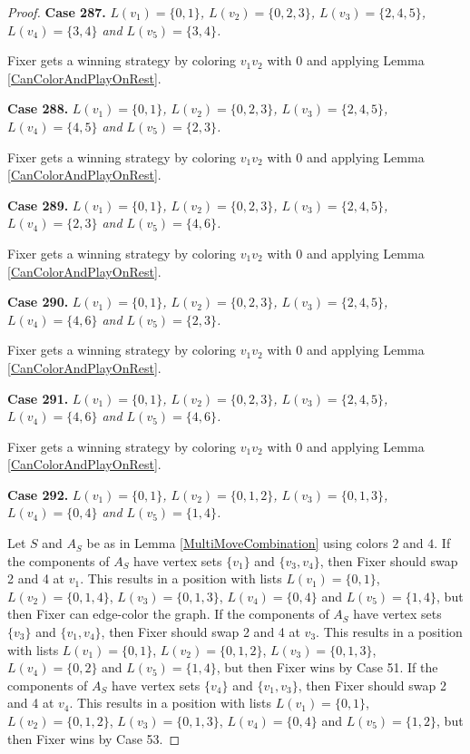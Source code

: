 \documentclass[12pt]{amsart}
\theoremstyle{plain}
\theoremstyle{definition}
\theoremstyle{remark}
\begin{document}
\begin{proof}
\noindent\textbf{Case 287.  }\textit{$L(v_1) = \{0, 1\}$, $L(v_2) = \{0, 2, 3\}$, $L(v_3) = \{2, 4, 5\}$, $L(v_4) = \{3, 4\}$ and $L(v_5) = \{3, 4\}$.}

Fixer gets a winning strategy by coloring $v_1v_2$ with $0$ and applying Lemma \ref{CanColorAndPlayOnRest}.

\noindent\textbf{Case 288.  }\textit{$L(v_1) = \{0, 1\}$, $L(v_2) = \{0, 2, 3\}$, $L(v_3) = \{2, 4, 5\}$, $L(v_4) = \{4, 5\}$ and $L(v_5) = \{2, 3\}$.}

Fixer gets a winning strategy by coloring $v_1v_2$ with $0$ and applying Lemma \ref{CanColorAndPlayOnRest}.

\noindent\textbf{Case 289.  }\textit{$L(v_1) = \{0, 1\}$, $L(v_2) = \{0, 2, 3\}$, $L(v_3) = \{2, 4, 5\}$, $L(v_4) = \{2, 3\}$ and $L(v_5) = \{4, 6\}$.}

Fixer gets a winning strategy by coloring $v_1v_2$ with $0$ and applying Lemma \ref{CanColorAndPlayOnRest}.

\noindent\textbf{Case 290.  }\textit{$L(v_1) = \{0, 1\}$, $L(v_2) = \{0, 2, 3\}$, $L(v_3) = \{2, 4, 5\}$, $L(v_4) = \{4, 6\}$ and $L(v_5) = \{2, 3\}$.}

Fixer gets a winning strategy by coloring $v_1v_2$ with $0$ and applying Lemma \ref{CanColorAndPlayOnRest}.

\noindent\textbf{Case 291.  }\textit{$L(v_1) = \{0, 1\}$, $L(v_2) = \{0, 2, 3\}$, $L(v_3) = \{2, 4, 5\}$, $L(v_4) = \{4, 6\}$ and $L(v_5) = \{4, 6\}$.}

Fixer gets a winning strategy by coloring $v_1v_2$ with $0$ and applying Lemma \ref{CanColorAndPlayOnRest}.

\noindent\textbf{Case 292.  }\textit{$L(v_1) = \{0, 1\}$, $L(v_2) = \{0, 1, 2\}$, $L(v_3) = \{0, 1, 3\}$, $L(v_4) = \{0, 4\}$ and $L(v_5) = \{1, 4\}$.}

Let $S$ and $A_S$ be as in Lemma \ref{MultiMoveCombination} using colors $2$ and $4$. If the components of $A_S$ have vertex sets $\{v_1\}$ and $\{v_3, v_4\}$, then Fixer should swap 2 and 4 at $v_1$. This results in a position with lists $L(v_1) = \{0, 1\}$, $L(v_2) = \{0, 1, 4\}$, $L(v_3) = \{0, 1, 3\}$, $L(v_4) = \{0, 4\}$ and $L(v_5) = \{1, 4\}$, but then Fixer can edge-color the graph. If the components of $A_S$ have vertex sets $\{v_3\}$ and $\{v_1, v_4\}$, then Fixer should swap 2 and 4 at $v_3$. This results in a position with lists $L(v_1) = \{0, 1\}$, $L(v_2) = \{0, 1, 2\}$, $L(v_3) = \{0, 1, 3\}$, $L(v_4) = \{0, 2\}$ and $L(v_5) = \{1, 4\}$, but then Fixer wins by Case 51. If the components of $A_S$ have vertex sets $\{v_4\}$ and $\{v_1, v_3\}$, then Fixer should swap 2 and 4 at $v_4$. This results in a position with lists $L(v_1) = \{0, 1\}$, $L(v_2) = \{0, 1, 2\}$, $L(v_3) = \{0, 1, 3\}$, $L(v_4) = \{0, 4\}$ and $L(v_5) = \{1, 2\}$, but then Fixer wins by Case 53. 


\end{proof}
\end{document}
